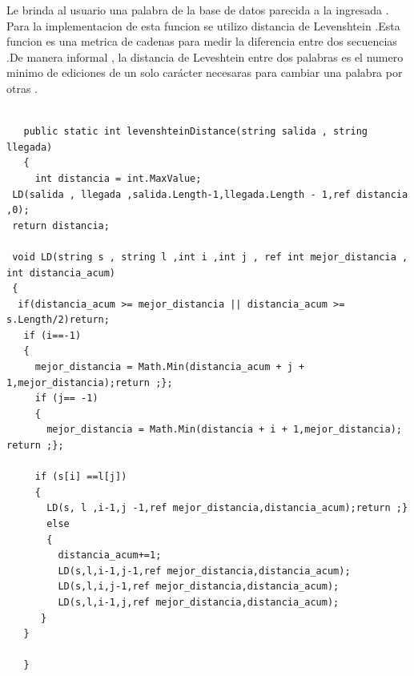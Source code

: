 \documentclass{article}
\begin{document}
Le brinda al usuario una palabra  de la base de datos parecida a la ingresada .
Para la implementacion de esta funcion se utilizo distancia de Levenshtein .Esta funcion es una metrica de cadenas para medir la diferencia entre dos secuencias .De manera informal , la distancia de Leveshtein  entre dos palabras es el numero minimo de ediciones de un solo carácter necesaras para cambiar una palabra por otras .
\small
\begin{lstlisting}

   public static int levenshteinDistance(string salida , string llegada)
   {
     int distancia = int.MaxValue;
 LD(salida , llegada ,salida.Length-1,llegada.Length - 1,ref distancia ,0);
 return distancia;

 void LD(string s , string l ,int i ,int j , ref int mejor_distancia , int distancia_acum)
 {
  if(distancia_acum >= mejor_distancia || distancia_acum >= s.Length/2)return;
   if (i==-1)
   {
     mejor_distancia = Math.Min(distancia_acum + j + 1,mejor_distancia);return ;};
     if (j== -1)
     {
       mejor_distancia = Math.Min(distancia + i + 1,mejor_distancia); return ;};
     
     if (s[i] ==l[j])
     {
       LD(s, l ,i-1,j -1,ref mejor_distancia,distancia_acum);return ;}
       else
       {
         distancia_acum+=1;
         LD(s,l,i-1,j-1,ref mejor_distancia,distancia_acum);
         LD(s,l,i,j-1,ref mejor_distancia,distancia_acum);
         LD(s,l,i-1,j,ref mejor_distancia,distancia_acum);
      }
   }

   }
   
\end{lstlisting}
\end{document}
